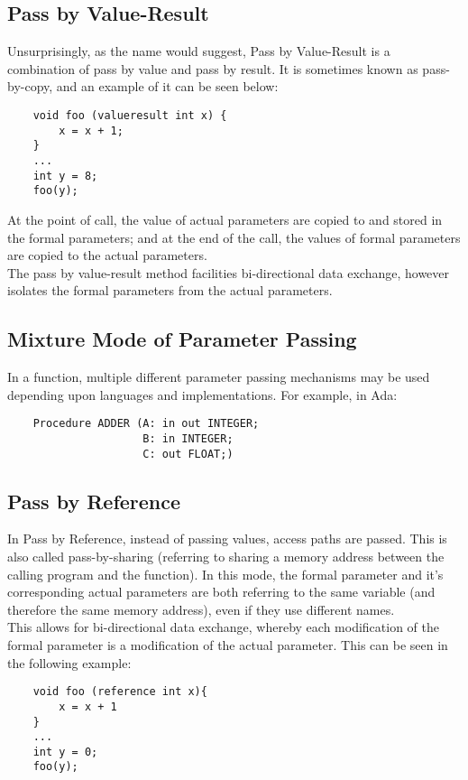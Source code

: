 \subsection{Pass by Value-Result}
Unsurprisingly, as the name would suggest, Pass by Value-Result is a combination of pass by value and pass by result. It is sometimes known as pass-by-copy, and an example of it can be seen below:
\begin{verbatim}
    void foo (valueresult int x) {
        x = x + 1;
    }
    ...
    int y = 8;
    foo(y);
\end{verbatim}

At the point of call, the value of actual parameters are copied to and stored in the formal parameters; and at the end of the call, the values of formal parameters are copied to the actual parameters.\\

The pass by value-result method facilities bi-directional data exchange, however isolates the formal parameters from the actual parameters. 

\subsection{Mixture Mode of Parameter Passing}
In a function, multiple different parameter passing mechanisms may be used depending upon languages and implementations. For example, in Ada:
\begin{verbatim}
    Procedure ADDER (A: in out INTEGER;
                     B: in INTEGER;
                     C: out FLOAT;)
\end{verbatim}

\subsection{Pass by Reference}
In Pass by Reference, instead of passing values, access paths are passed. This is also called pass-by-sharing (referring to sharing a memory address between the calling program and the function). In this mode, the formal parameter and it's corresponding actual parameters are both referring to the same variable (and therefore the same memory address), even if they use different names.\\

This allows for bi-directional data exchange, whereby each modification of the formal parameter is a modification of the actual parameter. This can be seen in the following example:
\begin{verbatim}
    void foo (reference int x){
        x = x + 1
    }
    ...
    int y = 0;
    foo(y);
\end{verbatim}

